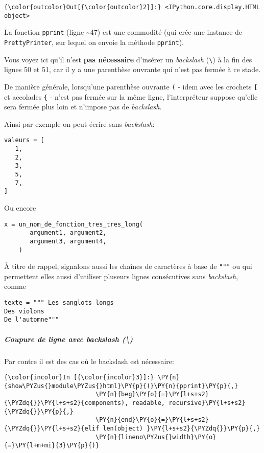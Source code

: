 \begin{Verbatim}[commandchars=\\\{\}]
{\color{outcolor}Out[{\color{outcolor}2}]:} <IPython.core.display.HTML object>
\end{Verbatim}
            
    La fonction \texttt{pprint} (ligne \textasciitilde{}47) est une
commodité (qui crée une instance de \texttt{PrettyPrinter}, sur lequel
on envoie la méthode \texttt{pprint}).

Vous voyez ici qu'il n'est \textbf{pas nécessaire} d'insérer un
\emph{backslash} (\texttt{\textbackslash{}}) à la fin des lignes 50 et
51, car il y a une parenthèse ouvrante qui n'est pas fermée à ce stade.

De manière générale, lorsqu'une parenthèse ouvrante \texttt{(} - idem
avec les crochets \texttt{{[}} et accolades \texttt{\{} - n'est pas
fermée sur la même ligne, l'interpréteur suppose qu'elle sera fermée
plus loin et n'impose pas de \emph{backslash}.

    Ainsi par exemple on peut écrire sans \emph{backslash}:

\begin{verbatim}
valeurs = [ 
   1,
   2,
   3,
   5,
   7,
]
\end{verbatim}

Ou encore

\begin{verbatim}
x = un_nom_de_fonction_tres_tres_long(
       argument1, argument2,
       argument3, argument4,
    )        
\end{verbatim}

    À titre de rappel, signalons aussi les chaînes de caractères à base de
\texttt{"""} ou
\texttt{\textquotesingle{}\textquotesingle{}\textquotesingle{}} qui
permettent elles aussi d'utiliser pluseurs lignes consécutives sans
\emph{backslash}, comme

\begin{verbatim}
texte = """ Les sanglots longs
Des violons
De l'automne"""
\end{verbatim}

    \hypertarget{coupure-de-ligne-avec-backslash}{%
\subparagraph{\texorpdfstring{Coupure de ligne avec \emph{backslash}
(\textbackslash{})}{Coupure de ligne avec backslash (\textbackslash{})}}\label{coupure-de-ligne-avec-backslash}}

    Par contre il est des cas où le backslash est nécessaire:

    \begin{Verbatim}[commandchars=\\\{\}]
{\color{incolor}In [{\color{incolor}3}]:} \PY{n}{show\PYZus{}module\PYZus{}html}\PY{p}{(}\PY{n}{pprint}\PY{p}{,} 
                         \PY{n}{beg}\PY{o}{=}\PY{l+s+s2}{\PYZdq{}}\PY{l+s+s2}{components), readable, recursive}\PY{l+s+s2}{\PYZdq{}}\PY{p}{,} 
                         \PY{n}{end}\PY{o}{=}\PY{l+s+s2}{\PYZdq{}}\PY{l+s+s2}{elif len(object) }\PY{l+s+s2}{\PYZdq{}}\PY{p}{,} 
                         \PY{n}{lineno\PYZus{}width}\PY{o}{=}\PY{l+m+mi}{3}\PY{p}{)}
\end{Verbatim}


